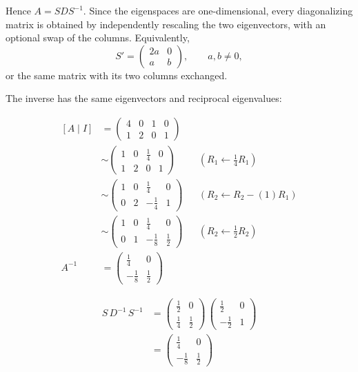 \documentclass[11pt]{article}
\begin{document}
Hence \(A=SDS^{-1}\). Since the eigenspaces are one-dimensional, every diagonalizing matrix is obtained by independently rescaling the two eigenvectors, with an optional swap of the columns. Equivalently,
\[S'=\begin{pmatrix}2a&0\\a&b\end{pmatrix},\qquad a,b\ne0,\]
or the same matrix with its two columns exchanged.

The inverse has the same eigenvectors and reciprocal eigenvalues:

\[\begin{aligned}\left[A\mid I\right] &= \begin{pmatrix}4 & 0 & 1 & 0 \\ 1 & 2 & 0 & 1\end{pmatrix} \\
&\sim \begin{pmatrix}1 & 0 & \frac{1}{4} & 0 \\ 1 & 2 & 0 & 1\end{pmatrix} && \left(R_{1}\leftarrow \frac{1}{4}R_{1}\right) \\
&\sim \begin{pmatrix}1 & 0 & \frac{1}{4} & 0 \\ 0 & 2 & -\frac{1}{4} & 1\end{pmatrix} && \left(R_{2}\leftarrow R_{2}-\left(1\right)R_{1}\right) \\
&\sim \begin{pmatrix}1 & 0 & \frac{1}{4} & 0 \\ 0 & 1 & -\frac{1}{8} & \frac{1}{2}\end{pmatrix} && \left(R_{2}\leftarrow \frac{1}{2}R_{2}\right) \\
A^{-1} &= \begin{pmatrix}\frac{1}{4} & 0 \\ -\frac{1}{8} & \frac{1}{2}\end{pmatrix}\end{aligned}\]

\[\begin{aligned}S\,D^{-1}\,S^{-1} &= \begin{pmatrix}\frac{1}{2} & 0 \\ \frac{1}{4} & \frac{1}{2}\end{pmatrix}\,\begin{pmatrix}\frac{1}{2} & 0 \\ -\frac{1}{2} & 1\end{pmatrix} \\
&= \begin{pmatrix}\frac{1}{4} & 0 \\ -\frac{1}{8} & \frac{1}{2}\end{pmatrix}\end{aligned}\]
\end{document}
